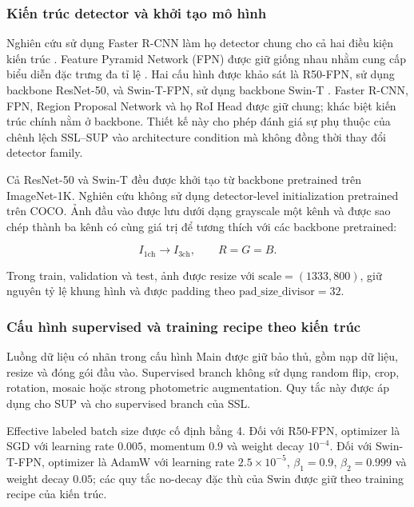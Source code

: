 \documentclass[pdflatex,sn-mathphys-num]{sn-jnl}%
\theoremstyle{thmstyleone}%
\theoremstyle{thmstyletwo}%
\theoremstyle{thmstylethree}%
\begin{document}
\subsubsection{Kiến trúc detector và khởi tạo mô hình}
\label{subsubsec:detector_architecture}

Nghiên cứu sử dụng Faster R-CNN làm họ detector chung cho cả hai điều kiện
kiến trúc \cite{ren2016faster}. Feature Pyramid Network (FPN) được giữ
giống nhau nhằm cung cấp biểu diễn đặc trưng đa tỉ lệ
\cite{lin2017feature}. Hai cấu hình được khảo sát là R50-FPN, sử dụng
backbone ResNet-50, và Swin-T-FPN, sử dụng backbone Swin-T
\cite{he2016deep,liu2021swin}. Faster R-CNN, FPN, Region Proposal Network
và họ RoI Head được giữ chung; khác biệt kiến trúc chính nằm ở backbone.
Thiết kế này cho phép đánh giá sự phụ thuộc của chênh lệch SSL--SUP vào
architecture condition mà không đồng thời thay đổi detector family.

Cả ResNet-50 và Swin-T đều được khởi tạo từ backbone pretrained trên
ImageNet-1K. Nghiên cứu không sử dụng detector-level initialization
pretrained trên COCO. Ảnh đầu vào được lưu dưới dạng grayscale một kênh và
được sao chép thành ba kênh có cùng giá trị để tương thích với các backbone
pretrained:

\begin{equation}
I_{\mathrm{1ch}}
\longrightarrow
I_{\mathrm{3ch}},
\qquad
R=G=B.
\label{eq:input_three_channel_mapping}
\end{equation}


Trong train, validation và test, ảnh được resize với
\(\mathrm{scale}=(1333, 800)\), giữ nguyên tỷ lệ khung hình và được padding
theo \(\mathrm{pad\_size\_divisor}=32\).

\subsubsection{Cấu hình supervised và training recipe theo kiến trúc}
\label{subsubsec:architecture_training_recipe}

Luồng dữ liệu có nhãn trong cấu hình Main được giữ bảo thủ, gồm nạp dữ
liệu, resize và đóng gói đầu vào. Supervised branch không sử dụng random
flip, crop, rotation, mosaic hoặc strong photometric augmentation. Quy tắc
này được áp dụng cho SUP và cho supervised branch của SSL.

Effective labeled batch size được cố định bằng 4. Đối với R50-FPN,
optimizer là SGD với learning rate \(0.005\), momentum \(0.9\) và weight
decay \(10^{-4}\). Đối với Swin-T-FPN, optimizer là AdamW với learning
rate \(2.5\times10^{-5}\), \(\beta_1=0.9\), \(\beta_2=0.999\) và weight
decay \(0.05\); các quy tắc no-decay đặc thù của Swin được giữ theo
training recipe của kiến trúc.
\end{document}
